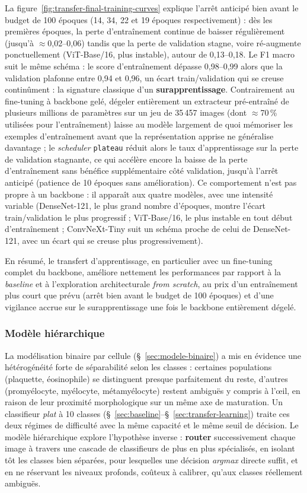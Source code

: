 La figure~\ref{fig:transfer-final-training-curves} explique l'arrêt anticipé bien avant le budget de 100 époques (14, 34, 22 et 19 époques respectivement) : dès les premières époques, la perte d'entraînement continue de baisser régulièrement (jusqu'à $\approx$0,02--0,06) tandis que la perte de validation stagne, voire ré-augmente ponctuellement (ViT-Base/16, plus instable), autour de 0,13--0,18.
Le F1 macro suit le même schéma : le score d'entraînement dépasse 0,98--0,99 alors que la validation plafonne entre 0,94 et 0,96, un écart train/validation qui se creuse continûment : la signature classique d'un \textbf{surapprentissage}.
Contrairement au fine-tuning à backbone gelé, dégeler entièrement un extracteur pré-entraîné de plusieurs millions de paramètres sur un jeu de 35\,457 images (dont $\approx$70\,\% utilisées pour l'entraînement) laisse au modèle largement de quoi mémoriser les exemples d'entraînement avant que la représentation apprise ne généralise davantage ; le \emph{scheduler} \texttt{plateau} réduit alors le taux d'apprentissage sur la perte de validation stagnante, ce qui accélère encore la baisse de la perte d'entraînement sans bénéfice supplémentaire côté validation, jusqu'à l'arrêt anticipé (patience de 10 époques sans amélioration).
Ce comportement n'est pas propre à un backbone : il apparaît aux quatre modèles, avec une intensité variable (DenseNet-121, le plus grand nombre d'époques, montre l'écart train/validation le plus progressif ; ViT-Base/16, le plus instable en tout début d'entraînement ; ConvNeXt-Tiny suit un schéma proche de celui de DenseNet-121, avec un écart qui se creuse plus progressivement).

En résumé, le transfert d'apprentissage, en particulier avec un fine-tuning complet du backbone, améliore nettement les performances par rapport à la \emph{baseline} et à l'exploration architecturale \emph{from scratch}, au prix d'un entraînement plus court que prévu (arrêt bien avant le budget de 100 époques) et d'une vigilance accrue sur le surapprentissage une fois le backbone entièrement dégelé.

\subsubsection{Modèle hiérarchique}
\label{sec:modele-hierarchique}

La modélisation binaire par cellule (\S~\ref{sec:modele-binaire}) a mis en évidence une hétérogénéité forte de séparabilité selon les classes : certaines populations (plaquette, éosinophile) se distinguent presque parfaitement du reste, d'autres (promyélocyte, myélocyte, métamyélocyte) restent ambiguës y compris à l'\oe{}il, en raison de leur proximité morphologique sur un même axe de maturation.
Un classifieur \emph{plat} à 10 classes (\S~\ref{sec:baseline}--\S~\ref{sec:transfer-learning}) traite ces deux régimes de difficulté avec la même capacité et le même seuil de décision.
Le modèle hiérarchique explore l'hypothèse inverse : \textbf{router} successivement chaque image à travers une cascade de classifieurs de plus en plus spécialisés, en isolant tôt les classes bien séparées, pour lesquelles une décision \emph{argmax} directe suffit, et en ne réservant les niveaux profonds, coûteux à calibrer, qu'aux classes réellement ambiguës.

